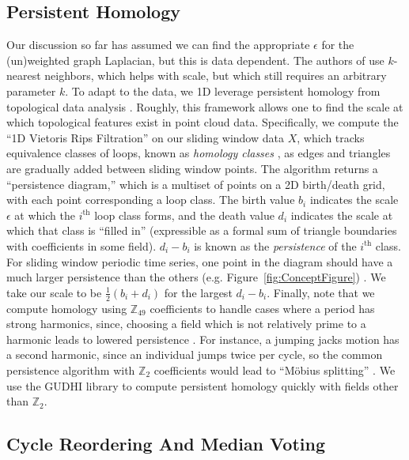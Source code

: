 \documentclass{article}
\begin{document}
\subsection{Persistent Homology}
Our discussion so far has assumed we can find the appropriate $\epsilon$ for the (un)weighted graph Laplacian, but this is data dependent.  The authors of \cite{averbuch2015ringit} use $k$-nearest neighbors, which helps with scale, but which still requires an arbitrary parameter $k$.  To adapt to the data, we 1D leverage persistent homology from topological data analysis \cite{edelsbrunner2010computational}.  Roughly, this framework allows one to find the scale at which topological features exist in point cloud data.  Specifically, we compute the ``1D Vietoris Rips Filtration'' on our sliding window data $X$, which tracks equivalence classes of loops, known as {\em homology classes} \cite{Hatcher}, as edges and triangles are gradually added between sliding window points.  The algorithm returns a ``persistence diagram,'' which is a multiset of points on a 2D birth/death grid, with each point corresponding a loop class.  The birth value $b_i$ indicates the scale $\epsilon$ at which the $i^{\text{th}}$ loop class forms, and the death value $d_i$ indicates the scale at which that class is ``filled in'' (expressible as a formal sum of triangle boundaries with coefficients in some field).  $d_i - b_i$ is known as the {\em persistence} of the $i^{\text{th}}$ class.  For sliding window periodic time series, one point in the diagram should have a much larger persistence than the others (e.g. Figure~\ref{fig:ConceptFigure}) \cite{perea2015sliding,tralie2017quasi}.  We take our scale to be $\frac{1}{2}(b_i + d_i)$ for the largest $d_i - b_i$.  
Finally, note that we compute homology using $\mathbb{Z}_{49}$ coefficients to handle cases where a period has strong harmonics, since, choosing a field which is not relatively prime to a harmonic leads to lowered persistence \cite{perea2015sliding, traliemoebius}.  For instance, a jumping jacks motion has a second harmonic, since an individual jumps twice per cycle, so the common persistence algorithm with $\mathbb{Z}_2$ coefficients would lead to ``M{\"o}bius splitting'' \cite{traliemoebius}.  We use the GUDHI library\cite{maria2014gudhi} to compute persistent homology quickly with fields other than $\mathbb{Z}_2$.

\subsection{Cycle Reordering And Median Voting}
\label{sec:cyclereordering}
\end{document}
